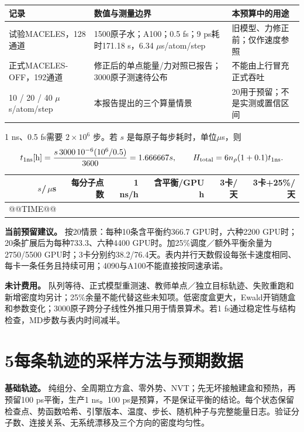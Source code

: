 \documentclass[a4paper]{ctexart}
\begin{document}
\begin{center}\small\begin{tabularx}{\textwidth}{lXX}\toprule
记录 & 数值与测量边界 & 本预算中的用途\\\midrule
试验MACELES，128通道 & 1500原子水；A100；0.5 fs；9 ps耗时171.18 s，6.34 $\mu$s/atom/step & 旧模型、力修正前；仅作速度参照\\
正式MACELES-OFF，192通道 & 修正后的单点能量/力对照已报告；3000原子测速待公布 & 不能由上行冒充正式吞吐\\
10 / 20 / 40 $\mu$s/atom/step & 本报告提出的三个算量情景 & 20用于预留；不是实测或置信区间\\\bottomrule
\end{tabularx}\end{center}

1 ns、0.5 fs需要 $2\times10^6$ 步。若 $s$ 是每原子每步耗时，单位$\mu$s，则
\[
t_{1\rm ns}[\mathrm h]=\frac{s\,3000\,10^{-6}(10^6/0.5)}{3600}
=1.666667s,\qquad
H_{\rm total}=6n_\rho(1+0.1)t_{1\rm ns}.
\]
\begin{center}\small\begin{tabular}{rrrrrr}\toprule
$s$/\,$\mu$s & 每分子点数 & 1 ns/h & 含平衡/GPU h & 3卡/天 & 3卡+25\%/天\\\midrule
@@TIME@@
\bottomrule\end{tabular}\end{center}

\textbf{当前预留建议。} 按20情景：每种10条含平衡约366.7 GPU时，六种2200 GPU时；20条扩展后为每种733.3、六种4400 GPU时。加25\%调度／额外平衡余量为2750/5500 GPU时；3卡分别约38.2/76.4天。表内并行天数假设每张卡速度相同、每卡一条任务且持续可用；4090与A100不能直接按同速承诺。

\textbf{未计费用。} 队列等待、正式模型重测速、教师单点／独立目标轨迹、失败重跑和新增密度均另计；25\%余量不能代替这些未知项。低密度盒更大，Ewald开销随盒和参数变化；3000原子跨分子线性外推只用于情景算术。若1 fs通过稳定性与结构检查，MD步数与表内时间减半。

\clearpage
\section*{5\quad 每条轨迹的采样方法与预期数据}
\textbf{基础轨迹。} 纯组分、全周期立方盒、零外势、NVT；先无坏接触建盒和预热，再预留100 ps平衡，生产1 ns。100 ps是预算，不是保证平衡的结论。每个状态保留检查点、势函数哈希、引擎版本、温度、步长、随机种子与完整能量日志。验证分子数、连接关系、无系统漂移及三个方向的密度均匀性。
\end{document}
